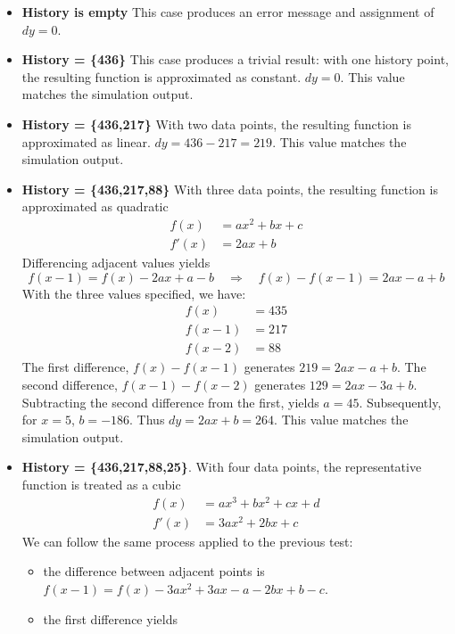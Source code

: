 \documentclass[11pt,fleqn]{report}
\begin{document}
\begin{itemize}
\item \textbf{History is empty} This case produces an error message and
assignment of $dy=0$.
\item \textbf{History = \{436\}} This case produces a trivial result: with
one history point, the resulting function is approximated as constant.
$dy = 0$.
This value matches the simulation output.
\item \textbf{History = \{436,217\}} With two data points, the resulting
function is approximated as linear. $dy = 436-217 = 219$.
This value matches the simulation output.
\item \textbf{History = \{436,217,88\}} With three data points, the
resulting function is approximated as quadratic
\begin{align*}
f(x) & =ax^2 + bx +c \\
f'(x) & = 2ax+b
\end{align*}
Differencing adjacent values yields
\begin{equation*}
f(x-1) = f(x) - 2ax + a -b \quad \Rightarrow \quad f(x) - f(x-1) = 2ax - a + b
\end{equation*}
With the three values specified, we have:
\begin{align*}
f(x) &= 435 \\
f(x-1) &= 217 \\
f(x-2) &= 88
\end{align*}
The first difference, $f(x) - f(x-1)$ generates $219 = 2ax - a + b$.\newline
The second difference, $f(x-1) - f(x-2)$ generates $129 = 2ax - 3a + b$.\newline
Subtracting the second difference from the first, yields $a=45$. Subsequently,
for $x=5$, $b=-186$. \newline
Thus $dy = 2ax+b = 264$. \newline
This value matches the simulation output.
\item \textbf{History = \{436,217,88,25\}}. With four data points, the
representative function is treated as a cubic
\begin{align*}
f(x) &= ax^3 + bx^2 + cx +d \\
f'(x) &= 3ax^2 + 2bx + c
\end{align*}
We can follow the same process applied to the previous test:
\begin{itemize}
\item the difference between adjacent points is
$f(x-1) = f(x) - 3ax^2+3ax-a-2bx+b-c$.
\item the first difference yields

\end{itemize}
\end{itemize}
\end{document}
